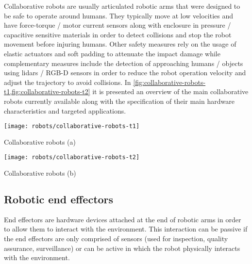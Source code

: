 Collaborative robots are usually articulated robotic arms that were designed to be safe to operate around humans. They typically move at low velocities and have force-torque / motor current sensors along with enclosure in pressure / capacitive sensitive materials in order to detect collisions and stop the robot movement before injuring humans. Other safety measures rely on the usage of elastic actuators and soft padding to attenuate the impact damage while complementary measures include the detection of approaching humans / objects using \glspl{lidar} / RGB-D sensors in order to reduce the robot operation velocity and adjust the trajectory to avoid collisions. In \cref{fig:collaborative-robots-t1,fig:collaborative-robots-t2} it is presented an overview of the main collaborative robots currently available along with the specification of their main hardware characteristics and targeted applications.



\begin{table}[H]
	\centering
	\texttt{[image: robots/collaborative-robots-t1]}
	\caption[Collaborative robots (a)]{Collaborative robots (a) \cite{Mathieu2015}}
	\label{fig:collaborative-robots-t1}
\end{table}

\begin{table}[H]
	\centering
	\texttt{[image: robots/collaborative-robots-t2]}
	\caption[Collaborative robots (b)]{Collaborative robots (b) \cite{Mathieu2015}}
	\label{fig:collaborative-robots-t2}
\end{table}


\subsection{Robotic end effectors}

End effectors are hardware devices attached at the end of robotic arms in order to allow them to interact with the environment. This interaction can be passive if the end effectors are only comprised of sensors (used for inspection, quality assurance, surveillance) or can be active in which the robot physically interacts with the environment.

